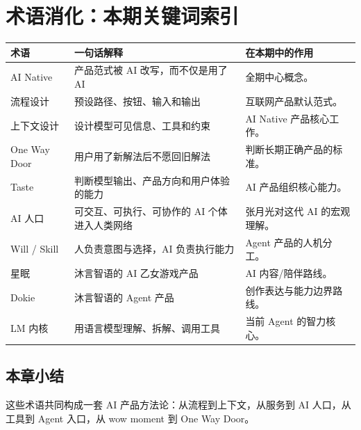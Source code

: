 \section{术语消化：本期关键词索引}

\begin{longtable}{p{}p{}p{}}
\toprule
术语 & 一句话解释 & 在本期中的作用 \\
\midrule
AI Native & 产品范式被 AI 改写，而不仅是用了 AI & 全期中心概念。 \\
流程设计 & 预设路径、按钮、输入和输出 & 互联网产品默认范式。 \\
上下文设计 & 设计模型可见信息、工具和约束 & AI Native 产品核心工作。 \\
One Way Door & 用户用了新解法后不愿回旧解法 & 判断长期正确产品的标准。 \\
Taste & 判断模型输出、产品方向和用户体验的能力 & AI 产品组织核心能力。 \\
AI 人口 & 可交互、可执行、可协作的 AI 个体进入人类网络 & 张月光对这代 AI 的宏观理解。 \\
Will / Skill & 人负责意图与选择，AI 负责执行能力 & Agent 产品的人机分工。 \\
星眠 & 沐言智语的 AI 乙女游戏产品 & AI 内容/陪伴路线。 \\
Dokie & 沐言智语的 Agent 产品 & 创作表达与能力边界路线。 \\
LM 内核 & 用语言模型理解、拆解、调用工具 & 当前 Agent 的智力核心。 \\
\bottomrule
\end{longtable}

\subsection{本章小结}

这些术语共同构成一套 AI 产品方法论：从流程到上下文，从服务到 AI 人口，从工具到 Agent 入口，从 wow moment 到 One Way Door。

